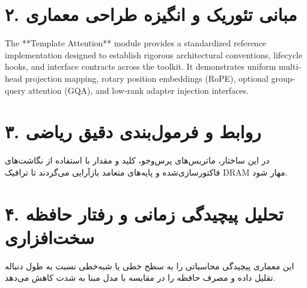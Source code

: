 \documentclass[12pt,a4paper]{article}
\begin{document}
\section*{۲. مبانی تئوریک و انگیزه طراحی معماری}
The **Template Attention** module provides a standardized reference implementation designed to establish rigorous architectural conventions, lifecycle hooks, and interface contracts across the toolkit. It demonstrates uniform multi-head projection mapping, rotary position embeddings (RoPE), optional group-query attention (GQA), and low-rank adapter injection interfaces.

\section*{۳. روابط و فرمول‌بندی دقیق ریاضی}
در این ساختار، ماتریس‌های پرس‌وجو، کلید و مقدار با استفاده از نگاشت‌های فاکتورسازی‌شده و پایه‌های متعامد بازآرایی می‌گردند تا ترافیک DRAM مهار شود.

\section*{۴. تحلیل پیچیدگی زمانی و رفتار حافظه سخت‌افزاری}
این معماری پیچیدگی محاسباتی را به سطح خطی یا شبه‌خطی نسبت به طول دنباله تقلیل داده و مصرف حافظه را در مقایسه با مدل مبنا به شدت کاهش می‌دهد.
\end{document}
